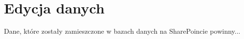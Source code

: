 \section{Edycja danych}

Dane, które zostały zamieszczone w bazach danych na SharePoincie powinny...